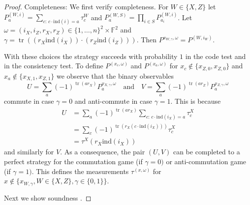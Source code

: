 \documentclass[11pt]{article}
\theoremstyle{definition}
\newcommand{\field}{\mathbb{F}}
\newcommand{\ind}{\ensuremath{\mathrm{ind}}}
\DeclareMathOperator{\tr}{tr}
\begin{document}
\begin{proof}
Completeness: We first verify completeness. For $W\in\{X,Z\}$ let $P^{(W,i)}_a = \sum_{c:\,c\cdot\ind(i)=a} \tau^W_{c}$ and $P^{(W,S)}_a = \prod_{i\in S} P^{(W,i)}_{a_i}$. Let $\omega=(i_X,i_Z,r_X,r_Z)\in \{1,\ldots,n\}^2 \times \field^2$ and $\gamma = \tr( (r_X\ind(i_X))\cdot  (r_Z \ind(i_Z)))$. Then $P^{x_{W,\gamma},\omega} = P^{(W,i_W)}$. 

With these choices the strategy succeeds with probability $1$ in the code test and in the consistency test. To define $P^{(x_c,\omega)}$ and $P^{(x_a,\omega)}$ for $x_c\notin \{x_{Z,0},x_{Z,0}\}$ and $x_a \notin \{x_{X,1},x_{Z,1}\}$ we observe that the binary observables 
\[ U = \sum_a (-1)^{\tr(ar_X)} P^{x_{X,\gamma},\omega}_a\quad\text{and}\quad V= \sum_a (-1)^{\tr(a r_Z)} P^{x_{Z,\gamma},\omega}_a \]
commute in case $\gamma=0$ and anti-commute in case $\gamma=1$. This is because 
\begin{align*}
U &=  \sum_a (-1)^{\tr(ar_X)} \sum_{c:\,c\cdot\ind(i_X)=a} \tau^X_{c}\\
&= \sum_c (-1)^{\tr(r_X (c\cdot\ind(i_X)))} \tau^X_{c}\\
&= \tau^X(r_X\ind(i_X))
\end{align*}
and similarly for $V$. As a consequence, the pair $(U,V)$ can be completed to a perfect strategy for the commutation game (if $\gamma=0)$ or anti-commutation game (if $\gamma=1)$. This defines the measurements $\tau^{(x,\omega)}$ for $x\notin \{x_{W,\gamma},W\in\{X,Z\},\gamma\in\{0,1\}\}$. 

Next we show soundness . 
\end{proof}




\notesendofpaper
\end{document}
